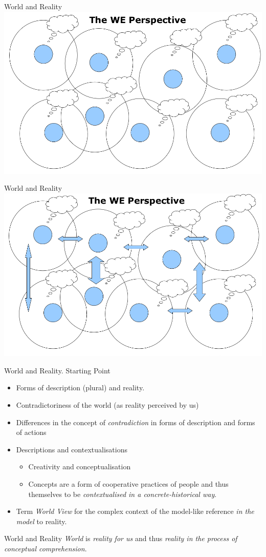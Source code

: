 \documentclass{beamer}
\begin{document}
\begin{frame}{World and Reality}\centering
    \includegraphics[width=.9\textwidth]{DI-2.png}
\end{frame}
\begin{frame}{World and Reality}\centering
    \includegraphics[width=.9\textwidth]{DI-3.png}
\end{frame}
\begin{frame}{World and Reality. Starting Point}
  \begin{itemize}
  \item Forms of description (plural) and reality.
  \item Contradictoriness of the world (as reality perceived by us)
  \item Differences in the concept of \emph{contradiction} in forms of
    description and forms of actions
  \item Descriptions and contextualisations
    \begin{itemize}
    \item Creativity and conceptualisation
    \item Concepts are a form of cooperative practices of people and thus
      themselves to be \emph{contextualised in a concrete-historical way}.
    \end{itemize}
  \item Term \emph{World View} for the complex context of the model-like
    reference \emph{in the model} to reality.
  \end{itemize}
  \begin{block}{World and Reality}
    \emph{World} is \emph{reality for us} and thus \emph{reality in the
      process of conceptual comprehension}.
  \end{block}
\end{frame}
\end{document}
